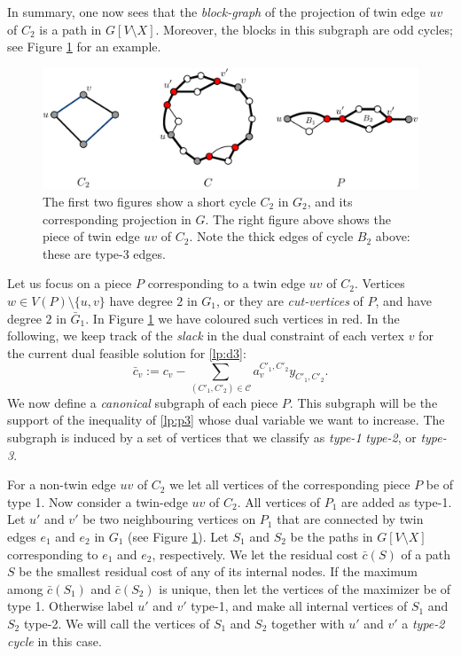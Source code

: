 \documentclass{article}
\newcommand{\C}{\ensuremath{\mathcal{C}}}
\newcommand{\0}{\mathbb{0}}
\newcommand{\1}{\mathbb{1}}
\begin{document}
In summary, one now sees that
the {\em block-graph} of the projection of twin edge $uv$ of $C_2$ is 
a path in $G[V\setminus X]$. Moreover, the
blocks in this subgraph are odd cycles; see Figure \ref{fig:cycG2} for
an example.

\begin{figure}[b]
  \begin{center}
    \includegraphics[width=.8\textwidth]{cycG2.pdf}
  \end{center}
  \caption{\label{fig:cycG2}The first two figures show a  short cycle $C_2$ in $G_2$, and its
    corresponding projection in $G$. The right figure above shows the piece
    of twin edge $uv$ of $C_2$. Note the thick edges of cycle $B_2$ above: these
    are type-3 edges.}
\end{figure}

Let us focus on a piece $P$ corresponding to a twin edge $uv$ of
$C_2$. Vertices $w \in V(P)\setminus  \{u,v\}$ have degree $2$ in
$G_1$, or they are {\em cut-vertices} of $P$, and have degree $2$ in
$\bar{G}_1$. In Figure \ref{fig:cycG2} we have coloured such vertices
in red.
In the following, we keep track of the 
{\em slack} in the dual constraint of each vertex $v$ for the current dual feasible
solution for \eqref{lp:d3}:
\[ \bar{c}_v := c_v - \sum_{(C'_1,C'_2) \in \C} a^{C'_1,C'_2}_vy_{C'_1,C'_2}.\]
We now define a {\em canonical} subgraph of each piece $P$. 
This subgraph will be the support of the inequality of \eqref{lp:p3} whose dual variable
we want to increase. The subgraph is induced by a set of vertices 
that we classify as {\em type-1}  
{\em type-2}, or {\em type-3}.

For a non-twin edge
$uv$ of $C_2$ we let all vertices of the corresponding piece $P$ be of type 1. 
Now consider a twin-edge $uv$ of $C_2$. All vertices of $P_1$ are added as type-1. 
Let $u'$ and $v'$ be two neighbouring vertices on $P_1$ that are connected by twin edges 
$e_1$ and $e_2$ in $G_1$ (see Figure \ref{fig:cycG2}). 
Let $S_1$ and
$S_2$ be the paths in $G[V\setminus X]$ corresponding to $e_1$ and
$e_2$, respectively. We let the residual cost $\bar{c}(S)$ of a path $S$ be the
smallest residual cost of any of its internal nodes. 
If the maximum among $\bar{c}(S_1)$ and $\bar{c}(S_2)$ is unique, then let the vertices
of the maximizer be of type 1. Otherwise label $u'$ and $v'$ type-1, and make all internal
vertices of $S_1$ and $S_2$ type-2. We will call the vertices of $S_1$ and $S_2$ together
with $u'$ and $v'$ a {\em type-2 cycle} in this case.
\end{document}
